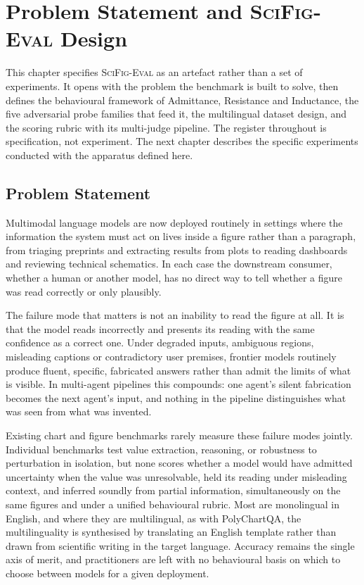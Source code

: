\chapter{Problem Statement and \textsc{SciFig-Eval} Design\label{chap:design}}

This chapter specifies \textsc{SciFig-Eval} as an artefact rather
than a set of experiments. It opens with the problem the
benchmark is built to solve, then defines the behavioural
framework of Admittance, Resistance and Inductance, the five
adversarial probe families that feed it, the multilingual dataset
design, and the scoring rubric with its multi-judge pipeline. The
register throughout is specification, not experiment. The next
chapter describes the specific experiments conducted with the
apparatus defined here.

\section{Problem Statement}
\label{sec:design-problem}

Multimodal language models are now deployed routinely in settings
where the information the system must act on lives inside a
figure rather than a paragraph, from triaging preprints and
extracting results from plots to reading dashboards and reviewing
technical schematics. In each case the downstream consumer,
whether a human or another model, has no direct way to tell
whether a figure was read correctly or only plausibly.

The failure mode that matters is not an inability to read the
figure at all. It is that the model reads incorrectly and
presents its reading with the same confidence as a correct one.
Under degraded inputs, ambiguous regions, misleading captions or
contradictory user premises, frontier models routinely produce
fluent, specific, fabricated answers rather than admit the limits
of what is visible. In multi-agent pipelines this compounds:
one agent's silent fabrication becomes the next agent's input,
and nothing in the pipeline distinguishes what was seen from what
was invented.

Existing chart and figure benchmarks rarely measure these failure
modes jointly. Individual benchmarks test value extraction,
reasoning, or robustness to perturbation in isolation, but none
scores whether a model would have admitted uncertainty when the
value was unresolvable, held its reading under misleading context,
and inferred soundly from partial information, simultaneously
on the same figures and under a unified behavioural rubric.
Most are monolingual in English, and where they are multilingual,
as with PolyChartQA, the multilinguality is synthesised by
translating an English template rather than drawn from scientific
writing in the target language. Accuracy remains the single axis
of merit, and practitioners are left with no behavioural basis on
which to choose between models for a given deployment.

